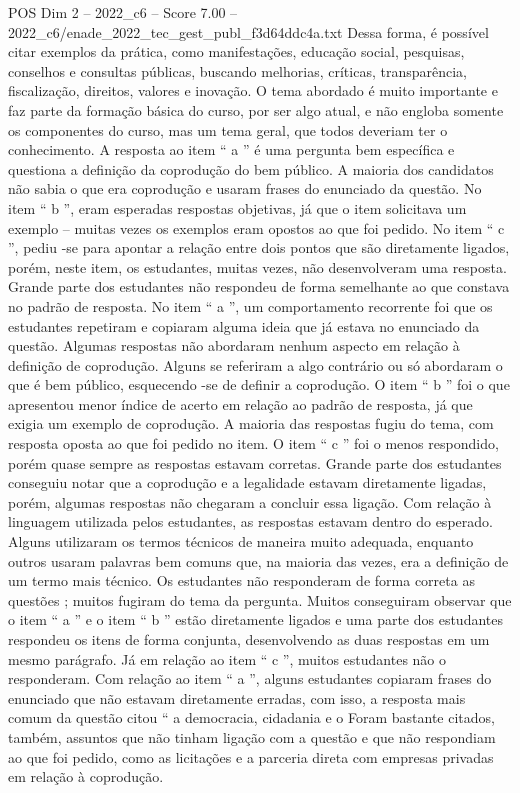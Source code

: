 \begin{textsample}{POS Dim 2 – 2022\_c6 – Score 7.00 – 2022\_c6/enade\_2022\_tec\_gest\_publ\_f3d64ddc4a.txt}
Dessa forma, é possível citar exemplos da prática, como manifestações, educação social, pesquisas, conselhos e consultas públicas, buscando melhorias, críticas, transparência, fiscalização, direitos, valores e inovação.
O tema abordado é muito importante e faz parte da formação básica do curso, por ser algo atual, e não engloba somente os componentes do curso, mas um tema geral, que todos deveriam ter o conhecimento.
A resposta ao item “ a ” é uma pergunta bem específica e questiona a definição da coprodução do bem público.
A maioria dos candidatos não sabia o que era coprodução e usaram frases do enunciado da questão.
No item “ b ”, eram esperadas respostas objetivas, já que o item solicitava um exemplo – muitas vezes os exemplos eram opostos ao que foi pedido.
No item “ c ”, pediu -se para apontar a relação entre dois pontos que são diretamente ligados, porém, neste item, os estudantes, muitas vezes, não desenvolveram uma resposta.
Grande parte dos estudantes não respondeu de forma semelhante ao que constava no padrão de resposta.
No item “ a ”, um comportamento recorrente foi que os estudantes repetiram e copiaram alguma ideia que já estava no enunciado da questão.
Algumas respostas não abordaram nenhum aspecto em relação à definição de coprodução.
Alguns se referiram a algo contrário ou só abordaram o que é bem público, esquecendo -se de definir a coprodução.
O item “ b ” foi o que apresentou menor índice de acerto em relação ao padrão de resposta, já que exigia um exemplo de coprodução.
A maioria das respostas fugiu do tema, com resposta oposta ao que foi pedido no item.
O item “ c ” foi o menos respondido, porém quase sempre as respostas estavam corretas.
Grande parte dos estudantes conseguiu notar que a coprodução e a legalidade estavam diretamente ligadas, porém, algumas respostas não chegaram a concluir essa ligação.
Com relação à linguagem utilizada pelos estudantes, as respostas estavam dentro do esperado.
Alguns utilizaram os termos técnicos de maneira muito adequada, enquanto outros usaram palavras bem comuns que, na maioria das vezes, era a definição de um termo mais técnico.
Os estudantes não responderam de forma correta as questões ; muitos fugiram do tema da pergunta.
Muitos conseguiram observar que o item “ a ” e o item “ b ” estão diretamente ligados e uma parte dos estudantes respondeu os itens de forma conjunta, desenvolvendo as duas respostas em um mesmo parágrafo.
Já em relação ao item “ c ”, muitos estudantes não o responderam.
Com relação ao item “ a ”, alguns estudantes copiaram frases do enunciado que não estavam diretamente erradas, com isso, a resposta mais comum da questão citou “ a democracia, cidadania e o Foram bastante citados, também, assuntos que não tinham ligação com a questão e que não respondiam ao que foi pedido, como as licitações e a parceria direta com empresas privadas em relação à coprodução.

\end{textsample}
